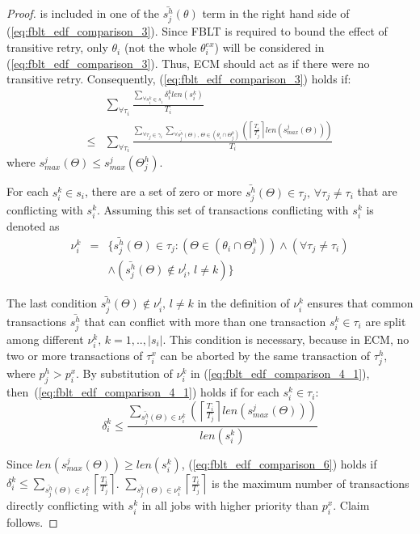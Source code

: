 \documentclass[conference]{IEEEtran}
\begin{document}
\begin{proof}
is included in one of the $\bar{s_{j}^{h}}(\theta)$ term in the right hand side of (\ref{eq:fblt_edf_comparison_3}). Since FBLT is required to bound the effect of transitive retry, only $\theta_i$ (not the whole $\theta_i^{ex}$) will be considered in (\ref{eq:fblt_edf_comparison_3}). Thus, ECM should act as if there were no transitive retry. Consequently, (\ref{eq:fblt_edf_comparison_3}) holds if:
\begin{eqnarray}
 & \sum_{\forall\tau_{i}}\frac{\sum_{\forall s_{i}^{k}\in s_{i}}\delta_i^klen(s_{i}^{k})}{T_{i}}\label{eq:fblt_edf_comparison_4_1}\\
\le &
\sum_{\forall\tau_{i}}\frac{\sum_{\forall\tau_{j}\in\gamma_{i}}\sum_{\forall \bar{s_{j}^{h}}(\Theta),\,\Theta\in(\theta_{i}\cap\Theta_j^h)}\left(\left\lceil \frac{T_{i}}{T_{j}}\right\rceil len\left(s_{max}^{j}(\Theta)\right)\right)}{T_{i}}\nonumber 
\end{eqnarray}
where $s_{max}^j(\Theta) \le s_{max}^j(\Theta_j^h)$. 

For each $s_{i}^{k}\in s_{i}$, there are a set of zero or more $\bar{s_{j}^{h}}(\Theta)\in\tau_{j},\,\forall\tau_{j}\ne\tau_{i}$
that are conflicting with $s_{i}^{k}$. Assuming this set of transactions conflicting with $s_{i}^{k}$ is denoted as 
\begin{eqnarray*}
\nu_{i}^{k} & = & \Big\{\bar{s_{j}^{h}}(\Theta)\in\tau_{j}:\left(\Theta\in(\theta_{i}\cap\Theta_j^h)\right)\wedge\left(\forall\tau_{j}\ne\tau_{i}\right)\\
& & \wedge\left(\bar{s_{j}^{h}}(\Theta)\not\in\nu_{i}^{l},\, l\ne k\right)\Big\}
\end{eqnarray*}

The last condition $\bar{s_{j}^{h}}(\Theta)\not\in\nu_{i}^{l},\, l\ne k$
in the definition of $\nu_{i}^{k}$ ensures that common transactions $\bar{s_{j}^{h}}$
that can conflict with more than one transaction $s_{i}^{k}\in\tau_{i}$
are split among different $\nu_{i}^{k},\, k=1,..,|s_{i}|$. This
condition is necessary, because in ECM, no two or more transactions
of $\tau_{i}^{x}$ can be aborted by the same transaction of $\tau_{j}^{h}$, 
where $p_{j}^{h}>p_{i}^{x}$. By substitution of $\nu_{i}^{k}$ in
(\ref{eq:fblt_edf_comparison_4_1}), then~(\ref{eq:fblt_edf_comparison_4_1}) holds if for each $s_{i}^{k}\in\tau_{i}$:
%
\begin{equation}
\delta_{i}^{k}\le\frac{\sum_{\bar{s_{j}^{h}}(\Theta)\in\nu_{i}^{k}}\left(\left\lceil \frac{T_{i}}{T_{j}}\right\rceil len\left(s_{max}^{j}(\Theta)\right)\right)}{len(s_{i}^{k})}\label{eq:fblt_edf_comparison_6}
\end{equation}

Since $len\left(s_{max}^{j}(\Theta)\right)\ge len(s_{i}^{k})$, (\ref{eq:fblt_edf_comparison_6}) holds if $\delta_{i}^{k}\le \sum_{\bar{s_{j}^{h}}(\Theta)\in\nu_{i}^{k}}\left\lceil \frac{T_{i}}{T_{j}}\right\rceil$. $\sum_{\bar{s_{j}^{h}}(\Theta)\in\nu_{i}^{k}}\left\lceil \frac{T_{i}}{T_{j}}\right\rceil$
is the maximum number of transactions directly conflicting with $s_i^k$ in all jobs with higher priority than $p_{i}^x$. Claim follows.
\end{proof}
%
\end{document}
